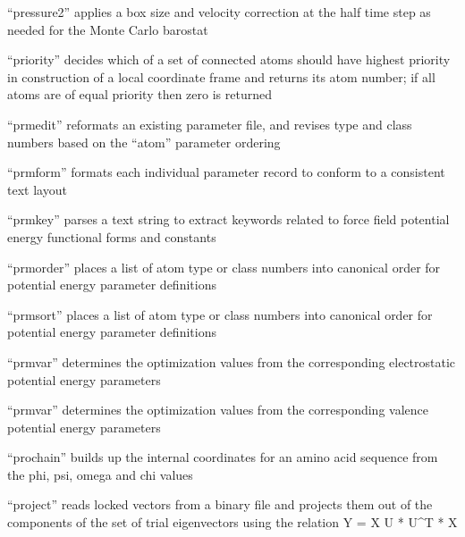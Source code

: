 \documentclass[letterpaper,11pt,english]{sphinxmanual}
\begin{document}

“pressure2” applies a box size and velocity correction at
the half time step as needed for the Monte Carlo barostat


“priority” decides which of a set of connected atoms should
have highest priority in construction of a local coordinate
frame and returns its atom number; if all atoms are of equal
priority then zero is returned


“prmedit” reformats an existing parameter file, and revises
type and class numbers based on the “atom” parameter ordering


“prmform” formats each individual parameter record to conform
to a consistent text layout


“prmkey” parses a text string to extract keywords related to
force field potential energy functional forms and constants


“prmorder” places a list of atom type or class numbers into
canonical order for potential energy parameter definitions


“prmsort” places a list of atom type or class numbers into
canonical order for potential energy parameter definitions


“prmvar” determines the optimization values from the
corresponding electrostatic potential energy parameters


“prmvar” determines the optimization values from the
corresponding valence potential energy parameters


“prochain” builds up the internal coordinates for an amino
acid sequence from the phi, psi, omega and chi values



“project” reads locked vectors from a binary file and projects
them out of the components of the set of trial eigenvectors
using the relation Y = X \sphinxhyphen{} U * U\textasciicircum{}T * X
\end{document}

